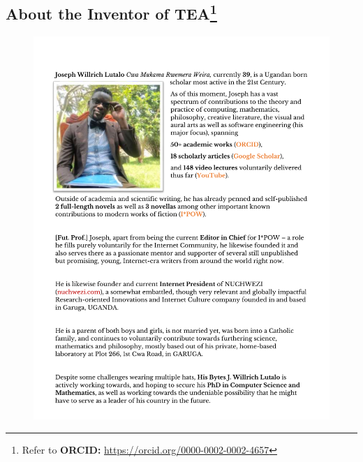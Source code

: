 \documentclass[a4paper, 18pt]{book} %
\begin{document}

\begin{center}
\vspace*{\fill}

\chapter*{About the Inventor of TEA\footnote{Refer to \textbf{ORCID:} \url{https://orcid.org/0000-0002-0002-4657}}}


\begin{figure}[H]
  \begin{center}
   \includegraphics[trim=0cm 1cm 0cm 2cm, clip, height=0.8\textheight,]{resources/pdfs/AboutAuthor.pdf}\\
  \end{center}
\end{figure}

\vspace*{\fill}
\end{center}



\end{document}
